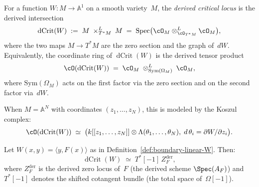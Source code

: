 \begin{definition}
\label{def:dcrit}
For a function $W\colon M \to \mathbb{A}^1$ on a smooth variety~$M$,
the \emph{derived critical locus} is the derived intersection
\begin{equation}\label{eq:dcrit}
\operatorname{dCrit}(W)
\;:=\; M \;\times^{L}_{T^*M}\; M
\;=\; \operatorname{Spec}\bigl(\cO_M
\otimes^{L}_{\cO_{T^*M}} \cO_M\bigr),
\end{equation}
where the two maps $M \to T^*M$ are the zero section and the
graph of~$dW$. Equivalently, the coordinate ring of
$\operatorname{dCrit}(W)$ is the derived tensor product
\[
\cO(\operatorname{dCrit}(W))
\;=\; \cO_M \;\otimes^{L}_{\mathrm{Sym}(\Omega_M)}\; \cO_M,
\]
where $\mathrm{Sym}(\Omega_M)$ acts on the first factor via the zero
section and on the second factor via~$dW$.

When $M = \mathbb{A}^N$ with coordinates $(z_1, \ldots, z_N)$, this is
modeled by the Koszul complex:
\[
\cO(\operatorname{dCrit}(W))
\;\simeq\;
\bigl(k[[z_1, \ldots, z_N]] \otimes
\Lambda(\theta_1, \ldots, \theta_N),\;
d\,\theta_i = \partial W / \partial z_i\bigr).
\]
\end{definition}

\begin{lemma}
\ClaimStatusProvedHere
\label{lem:dcrit-boundary-linear}
Let $W(x,y) = \langle y, F(x) \rangle$ as in
Definition~\textup{\ref{def:boundary-linear-W}}. Then:
\[
\operatorname{dCrit}(W) \;\simeq\; T^*[-1]\, Z_F^{\mathrm{der}},
\]
where $Z_F^{\mathrm{der}}$ is the derived zero locus of~$F$
\textup{(}the derived scheme $\Spec(A_F)$\textup{)} and
$T^*[-1]$ denotes the shifted cotangent bundle
\textup{(}the total space of~$\Omega[-1]$\textup{)}.
\end{lemma}

